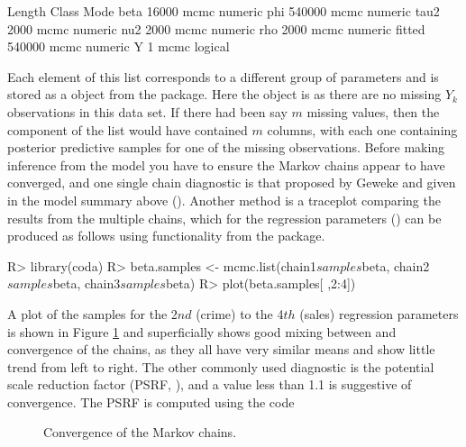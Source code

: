 \documentclass[article,shortnames,nojss]{jss}
\begin{document}
\begin{CodeOutput}
       Length Class Mode   
beta    16000 mcmc  numeric
phi    540000 mcmc  numeric
tau2     2000 mcmc  numeric
nu2      2000 mcmc  numeric
rho      2000 mcmc  numeric
fitted 540000 mcmc  numeric
Y           1 mcmc  logical
\end{CodeOutput}

Each element of this list corresponds to a different group of parameters and is stored as a   object from the  package. Here the  object is  as there are no missing $Y_{k}$ observations in this data set. If there had been say $m$ missing values, then the  component of the list would have contained $m$ columns, with each one containing posterior predictive samples for one of the missing observations. Before making inference from the model you have to ensure the Markov chains appear to have converged, and one single chain diagnostic is that proposed by Geweke and given in the model summary above (). Another method is a traceplot comparing the results from the multiple chains, which for the regression parameters () can be produced as follows using functionality from the  package.

\begin{CodeInput}
R> library(coda)
R> beta.samples <- mcmc.list(chain1$samples$beta, chain2$samples$beta, 
      chain3$samples$beta)
R> plot(beta.samples[ ,2:4])
\end{CodeInput}

A plot of the samples for the 2$nd$ (crime) to the 4$th$ (sales) regression parameters is shown in Figure \ref{priceMCMC} and superficially shows good mixing between and convergence of the chains, as they all have very similar means and show little trend from left to right. The other commonly used diagnostic is the potential scale reduction factor (PSRF, \cite{gelman2003}), and a value less than 1.1 is suggestive of convergence. The PSRF is computed using the code


\begin{figure}
\centering 
{}
\caption{Convergence of the Markov chains.\label{priceMCMC}}
\end{figure} 
\end{document}
